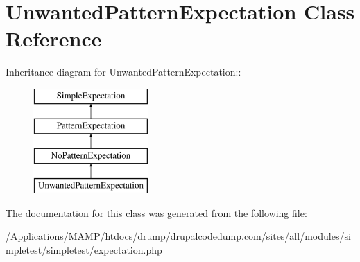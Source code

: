 \hypertarget{class_unwanted_pattern_expectation}{
\section{UnwantedPatternExpectation Class Reference}
\label{class_unwanted_pattern_expectation}
}
Inheritance diagram for UnwantedPatternExpectation::\begin{figure}[H]
\begin{center}
\leavevmode
\includegraphics[height=4cm]{class_unwanted_pattern_expectation}
\end{center}
\end{figure}


The documentation for this class was generated from the following file:\begin{DoxyCompactItemize}
\item 
/Applications/MAMP/htdocs/drump/drupalcodedump.com/sites/all/modules/simpletest/simpletest/expectation.php\end{DoxyCompactItemize}
